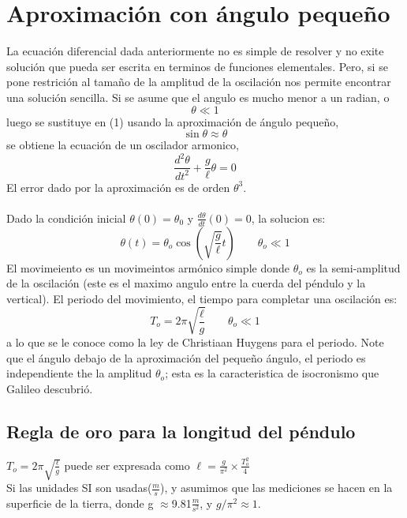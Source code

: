 \documentclass[12pt]{article}
\begin{document}
\pagebreak
\section{Aproximación con ángulo pequeño}
La ecuación diferencial dada anteriormente no es simple de resolver y no exite solución que pueda ser escrita en terminos de funciones elementales. Pero, si se pone restrición al tamaño de la amplitud de la oscilación nos permite encontrar una solución sencilla. Si se asume que el angulo es mucho menor a un radian, o 
{$$\theta \ll 1$$}
luego se sustituye en (1) usando la aproximación de ángulo pequeño,
{ $$\sin \theta \approx \theta $$}
se obtiene la ecuación de un oscilador armonico,
{ $$\frac{d^2\theta}{dt^2}+\frac{g}{\ell}\theta=0$$}
 El error dado por la aproximación es de orden $\theta^3$.\\
 \\
 Dado la condición inicial $\theta(0)= \theta_0$ y $\frac{d\theta}{dt}(0)=0$, la solucion es:
{ $$\theta(t)= \theta_o \cos \left(\sqrt{\frac{g}{\ell}}t \right) \qquad  \theta_o \ll 1  $$}
El movimeiento es un movimeintos armónico simple donde $\theta_o$ es la semi-amplitud de la oscilación (este es el maximo angulo entre la cuerda del péndulo y la vertical). El periodo del movimiento, el tiempo para completar una oscilación es: 
{$$ T_o=2\pi\sqrt{\frac{\ell}{g}} \qquad  \theta_o \ll 1$$}
a lo que se le conoce como la ley de Christiaan Huygens para el periodo. Note que el ángulo debajo de la aproximación del pequeño ángulo, el periodo es independiente the la amplitud $\theta_o$; esta es la caracteristica de isocronismo que Galileo descubrió.

\subsection{Regla de oro para la longitud del péndulo}
{\large $ T_o=2\pi\sqrt{\frac{\ell}{g}}$} puede ser expresada como {\large$\ell=\frac{g}{\pi^2}\times \frac{T_o^2}{4}$}\\
Si las unidades SI son usadas($\frac{m}{s}$), y asumimos que las mediciones se hacen en la superficie de la tierra, donde {g $\approx$9.81$\frac{m}{s^2}$}, y $g/\pi^2 \approx 1$.
\end{document}
